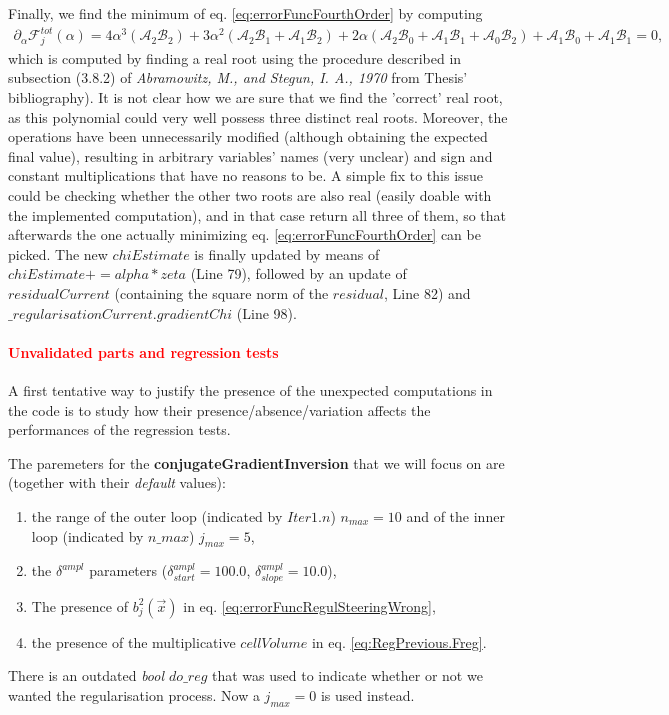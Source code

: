 \documentclass[10pt,a4paper]{article}
\begin{document}
{Finally, we find the minimum of eq. \eqref{eq:errorFuncFourthOrder} by computing
\begin{align}
 \partial_\alpha \mathcal{F}^{tot}_{{j}}(\alpha) = 4\alpha^3 (\mathcal{A}_2 \mathcal{B}_2)+3\alpha^2(\mathcal{A}_2\mathcal{B}_1 + \mathcal{A}_1\mathcal{B}_2) + 2\alpha (\mathcal{A}_2\mathcal{B}_0 + \mathcal{A}_1\mathcal{B}_1 +\mathcal{A}_0\mathcal{B}_2) + \mathcal{A}_1\mathcal{B}_0 +\mathcal{A}_1\mathcal{B}_1=0, 
\end{align} 
 which is computed by finding a real root using the procedure described in subsection (3.8.2) of \textit{Abramowitz, M., and Stegun, I. A., 1970} from Thesis' bibliography).
It is not clear how we are sure that we find the 'correct' real root, as this polynomial could very well possess three distinct real roots.
Moreover, the operations have been unnecessarily modified (although obtaining the expected final value), resulting in arbitrary variables' names (very unclear) and sign and constant multiplications that have no reasons to be. 
A simple fix to this issue could be checking whether the other two roots are also real (easily doable with the implemented computation), and in that case return all three of them, so that afterwards the one actually minimizing eq. \eqref{eq:errorFuncFourthOrder} can be picked.
\newline
The new $chiEstimate$ is finally updated by means of $chiEstimate += alpha * zeta$ (Line 79), followed by an update of $residualCurrent$ (containing the square norm of the $residual$, Line 82) and $\_regularisationCurrent.gradientChi$ (Line 98).
\newline



\textcolor{red}{
\paragraph{Unvalidated parts and regression tests}}

A first tentative way to justify the presence of the unexpected computations in the code is to study how their presence/absence/variation affects the performances of the regression tests.

The paremeters for the \textbf{conjugateGradientInversion} that we will focus on are (together with their \textit{default} values):
\begin{enumerate}
\item the range of the outer loop (indicated by $Iter1.n$) $n_{max}=10$ and of the inner loop (indicated by $n\_max$) $j_{max}=5$,
\item the $\delta^{ampl}$ parameters ($\delta^{ampl}_{start} =100.0$, $\delta^{ampl}_{slope} =10.0$),
\item The presence of $b_j^2(\vec{x})$ in eq. \eqref{eq:errorFuncRegulSteeringWrong},
\item the presence of the multiplicative $cellVolume$ in eq. \eqref{eq:RegPrevious.Freg}.
\end{enumerate}
There is an outdated \textit{bool $do\_reg$} that was used to indicate whether or not we wanted the regularisation process.
Now a $j_{max}=0$ is used instead.


}
\end{document}
